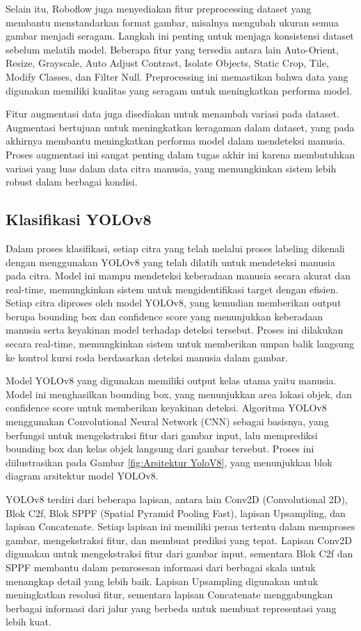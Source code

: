 Selain itu, Roboflow juga menyediakan fitur preprocessing dataset yang membantu menstandarkan format gambar, misalnya mengubah ukuran semua gambar menjadi seragam. Langkah ini penting untuk menjaga konsistensi dataset sebelum melatih model. Beberapa fitur yang tersedia antara lain Auto-Orient, Resize, Grayscale, Auto Adjust Contrast, Isolate Objects, Static Crop, Tile, Modify Classes, dan Filter Null. Preprocessing ini memastikan bahwa data yang digunakan memiliki kualitas yang seragam untuk meningkatkan performa model.

Fitur augmentasi data juga disediakan untuk menambah variasi pada dataset. Augmentasi bertujuan untuk meningkatkan keragaman dalam dataset, yang pada akhirnya membantu meningkatkan performa model dalam mendeteksi manusia. Proses augmentasi ini sangat penting dalam tugas akhir ini karena membutuhkan variasi yang luas dalam data citra manusia, yang memungkinkan sistem lebih robust dalam berbagai kondisi.

\subsection{Klasifikasi YOLOv8}
\label{subsec:klasifikasiyolov8}

Dalam proses klasifikasi, setiap citra yang telah melalui proses labeling dikenali dengan menggunakan YOLOv8 yang telah dilatih untuk mendeteksi manusia pada citra. Model ini mampu mendeteksi keberadaan manusia secara akurat dan real-time, memungkinkan sistem untuk mengidentifikasi target dengan efisien. Setiap citra diproses oleh model YOLOv8, yang kemudian memberikan output berupa bounding box dan confidence score yang menunjukkan keberadaan manusia serta keyakinan model terhadap deteksi tersebut. Proses ini dilakukan secara real-time, memungkinkan sistem untuk memberikan umpan balik langsung ke kontrol kursi roda berdasarkan deteksi manusia dalam gambar.

Model YOLOv8 yang digunakan memiliki output kelas utama yaitu manusia. Model ini menghasilkan bounding box, yang menunjukkan area lokasi objek, dan confidence score untuk memberikan keyakinan deteksi. Algoritma YOLOv8 menggunakan Convolutional Neural Network (CNN) sebagai basisnya, yang berfungsi untuk mengekstraksi fitur dari gambar input, lalu memprediksi bounding box dan kelas objek langsung dari gambar tersebut. Proses ini diilustrasikan pada Gambar \ref{fig:Arsitektur YoloV8}, yang menunjukkan blok diagram arsitektur model YOLOv8.

YOLOv8 terdiri dari beberapa lapisan, antara lain Conv2D (Convolutional 2D), Blok C2f, Blok SPPF (Spatial Pyramid Pooling Fast), lapisan Upsampling, dan lapisan Concatenate. Setiap lapisan ini memiliki peran tertentu dalam memproses gambar, mengekstraksi fitur, dan membuat prediksi yang tepat. Lapisan Conv2D digunakan untuk mengekstraksi fitur dari gambar input, sementara Blok C2f dan SPPF membantu dalam pemrosesan informasi dari berbagai skala untuk menangkap detail yang lebih baik. Lapisan Upsampling digunakan untuk meningkatkan resolusi fitur, sementara lapisan Concatenate menggabungkan berbagai informasi dari jalur yang berbeda untuk membuat representasi yang lebih kuat.


